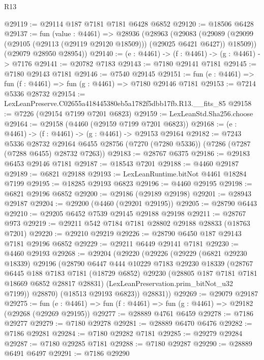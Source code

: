 \begin{lexlean}{R13}
\begin{coremodule}
@29119 := @29114 @187 @7181 @7181 @6428 @6852
@29120 := @18506 @6428
@29137 := fun (value : @4461) =>
  @28936
    (@28963
      (@29083
        (@29089 (@29099 (@29105 (@29113 (@29119 @29120 @18509))) (@29025 @6421 @6427)) @18509))
      (@29079 @28950 @28954))
@29140 := (e : @4461) -> (f : @4461) -> (g : @4461) -> @7176
@29141 := @20782 @7183
@29143 := @7180 @29141 @7181
@29145 := @7180 @29143 @7181
@29146 := @7540 @29145
@29151 := fun (e : @4461) => fun (f : @4461) => fun (g : @4461) => @7180 @29146 @7181
@29153 := @7214 @5336 @28732
@29154 := LexLeanPreserve.C02655a418445380eb5a1782f5dbb17fb.R13.__fits_85
@29158 := @7226 (@29154 @7199 @7201 @6823)
@29159 := LexLeanStd.Sha256.choose
@29164 := @29158 (@4460 (@29159 @7199 @7201 @6823))
@29168 := (e : @4461) -> (f : @4461) -> (g : @4461) -> @29153 @29164
@29182 := @7243
    @5336
    @28732
    @29164
    @6455
    @28756
    (@7270 (@7280 @5336))
    (@7286 (@7287 (@7288 @6455) @28732 @7263))
@29183 := @28767 @6375
@29186 := @29183 @6453 @29146 @7181
@29187 := @18543 @7201
@29188 := @4460 @29187
@29189 := @6821 @29188
@29193 := LexLeanRuntime.bitNot @4461 @18284 @7199
@29195 := @18285 @29193 @6823
@29196 := @4460 @29195
@29198 := @6821 @29196 @6852
@29200 := @29186 (@29189 @29198)
@29201 := @28943 @29187
@29204 := @29200 (@4460 (@29201 @29195))
@29205 := @28790 @6443
@29210 := @29205 @6452 @7539 @29145 @29188 @29198
@29211 := @28767 @973
@29219 := @29211 @542 @7184 @7181 @28802 @29188 @28833 (@18763 @7201)
@29220 := @29210 @29219
@29226 := @28790 @6450 @187 @29143 @7181 @29196 @6852
@29229 := @29211 @6449 @29141 @7181
@29230 := @4460 @29193
@29268 := @29204
    (@29220
      (@29226
        (@29229
          (@6821 @29230 @18339)
          @29196
          (@28790
            @6447
            @444
            @10229
            @7183
            @29230
            @18339
            (@28767
              @6445
              @188
              @7183
              @7181
              (@18729 @6852)
              @29230
              (@28805 @187 @7181 @7181 @18669 @6852 @28817 @28831)
              (LexLeanPreservation.prim_bitNot_u32 @7199))
            @28870)
          (@18513 @29193 @6823))
        @28831))
@29269 := @29079 @29187
@29275 := fun (e : @4461) => fun (f : @4461) => fun (g : @4461) => @29182 (@29268 (@29269 @29195))
@29277 := @28889 @4761 @6459
@29278 := @7186 @29277
@29279 := @7180 @29278
@29281 := @28889 @6470 @6476
@29282 := @7186 @29281
@29284 := @7180 @29282 @7181
@29285 := @29279 @29284
@29287 := @7180 @29285 @7181
@29288 := @7180 @29287
@29290 := @28889 @6491 @6497
@29291 := @7186 @29290

\end{coremodule}
\end{lexlean}

